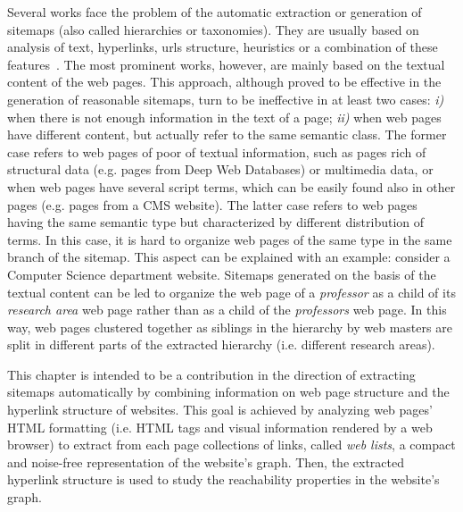 Several works face the problem of the automatic extraction or generation of sitemaps (also called hierarchies or taxonomies). They are usually based on analysis of text, hyperlinks, urls structure, heuristics or a combination of these features~\cite{Liu:2004, Yang:2009, Lin:2011, Weninger:2012}. 
The most prominent works, however, are mainly based on the textual content of the web pages. This approach, although proved to be effective in the generation of reasonable sitemaps,  turn to be ineffective in at least two cases: \emph{i)} when there is not enough information in the text of a page; \emph{ii)} when web pages have different content, but actually refer to the same semantic class.
The former case refers to web pages of poor of textual information, such as pages rich of structural data (e.g. pages from Deep Web Databases) or multimedia data, or when web pages have several script terms, which can be easily found also in other pages (e.g. pages from a CMS website). The latter case refers to web pages having the same semantic type but characterized by different distribution of terms.
In this case, it is hard to organize web pages of the same type in the same branch of the sitemap.
This aspect can be explained with an example: consider a Computer Science department website. Sitemaps generated on the basis of the textual content can be led to organize the web page of a \emph{professor} as a child of its \emph{research area} web page rather than as a child of the \emph{professors} web page. In this way, web pages clustered together as siblings in the hierarchy by web masters are split in different parts of the extracted hierarchy (i.e. different research areas).


This chapter is intended to be a contribution in the direction of extracting sitemaps automatically by combining information on web page structure and the hyperlink structure of websites.
This goal is achieved by analyzing web pages' HTML formatting (i.e. HTML tags and visual information rendered by a web browser) to extract from each page collections of links, called \emph{web lists}, a compact and noise-free representation of the website's graph. Then, the extracted hyperlink structure is used to study the reachability properties in the website's graph.


